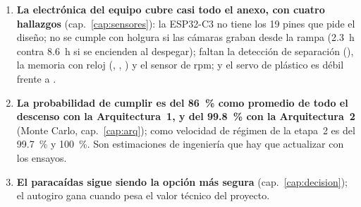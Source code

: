 \begin{enumerate}
        pasador. Una caída libre de \SIrange{0.2}{0.3}{s} entre la suelta y la apertura suma
        \SIrange{1.7}{2.5}{m/s}; si el drogue no se suelta, el rotor sigue funcionando (modo
        pendular estable, $\SI{5.8}{m/s}$).
  \item \textbf{La electrónica del equipo cubre casi todo el anexo, con cuatro hallazgos}
        (cap.~\ref{cap:sensores}): la ESP32-C3 no tiene los 19 pines que pide el diseño; 
        no se cumple con holgura si las cámaras graban desde la rampa (\SI{2.3}{h} contra \SI{8.6}{h}
        si se encienden al despegar); faltan la detección de separación (), la memoria con
        reloj (, , ) y el sensor de rpm; y el servo de plástico es débil
        frente a .
  \item \textbf{La probabilidad de cumplir  es del \SI{86}{\percent} como promedio de
        todo el descenso con la Arquitectura~1, y del \SI{99.8}{\percent} con la Arquitectura~2}
        (Monte Carlo, cap.~\ref{cap:arq}); como velocidad de régimen de la etapa~2 es del
        \SI{99.7}{\percent} y \SI{100}{\percent}. Son estimaciones de ingeniería que hay que
        actualizar con los ensayos.
  \item \textbf{El paracaídas sigue siendo la opción más segura} (cap.~\ref{cap:decision}); el
        autogiro gana cuando pesa el valor técnico del proyecto.
\end{enumerate}

